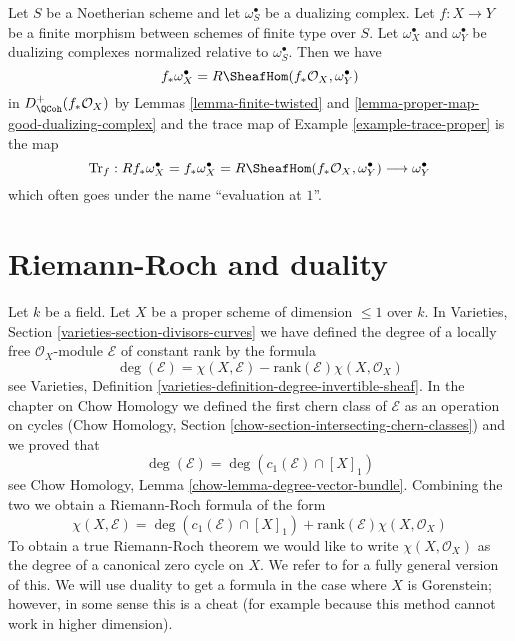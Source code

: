\begin{remark}
\label{remark-dualizing-finite}
Let $S$ be a Noetherian scheme and let $\omega_S^\bullet$ be a dualizing
complex. Let $f : X \to Y$ be a finite morphism between schemes of finite
type over $S$. Let $\omega_X^\bullet$ and $\omega_Y^\bullet$ be
dualizing complexes normalized relative to $\omega_S^\bullet$.
Then we have
$$
f_*\omega_X^\bullet = R\SheafHom(f_*\mathcal{O}_X, \omega_Y^\bullet)
$$
in $D_\QCoh^+(f_*\mathcal{O}_X)$ by Lemmas \ref{lemma-finite-twisted} and
\ref{lemma-proper-map-good-dualizing-complex}
and the trace map of Example \ref{example-trace-proper} is the map
$$
\text{Tr}_f : Rf_*\omega_X^\bullet = f_*\omega_X^\bullet =
R\SheafHom(f_*\mathcal{O}_X, \omega_Y^\bullet) \longrightarrow
\omega_Y^\bullet
$$
which often goes under the name ``evaluation at $1$''.
\end{remark}









\section{Riemann-Roch and duality}
\label{section-Riemann-Roch}

\noindent
Let $k$ be a field. Let $X$ be a proper scheme of dimension $\leq 1$
over $k$. In Varieties, Section \ref{varieties-section-divisors-curves}
we have defined the degree of a locally free $\mathcal{O}_X$-module
$\mathcal{E}$ of constant rank by the formula
$$
\deg(\mathcal{E}) =
\chi(X, \mathcal{E}) - \text{rank}(\mathcal{E})\chi(X, \mathcal{O}_X)
$$
see Varieties, Definition \ref{varieties-definition-degree-invertible-sheaf}.
In the chapter on Chow Homology we defined the first chern class of
$\mathcal{E}$ as an operation on cycles
(Chow Homology, Section
\ref{chow-section-intersecting-chern-classes}) and we proved that
$$
\deg(\mathcal{E}) = \deg(c_1(\mathcal{E}) \cap [X]_1)
$$
see Chow Homology, Lemma \ref{chow-lemma-degree-vector-bundle}.
Combining the two we obtain a Riemann-Roch formula of the form
$$
\chi(X, \mathcal{E}) =
\deg(c_1(\mathcal{E}) \cap [X]_1) +
\text{rank}(\mathcal{E})\chi(X, \mathcal{O}_X)
$$
To obtain a true Riemann-Roch theorem we would like to write
$\chi(X, \mathcal{O}_X)$ as the degree of a canonical zero cycle on $X$.
We refer to \cite{F} for a fully general version of this. We will use
duality to get a formula in the case where $X$ is Gorenstein; however,
in some sense this is a cheat (for example because this method cannot
work in higher dimension).

